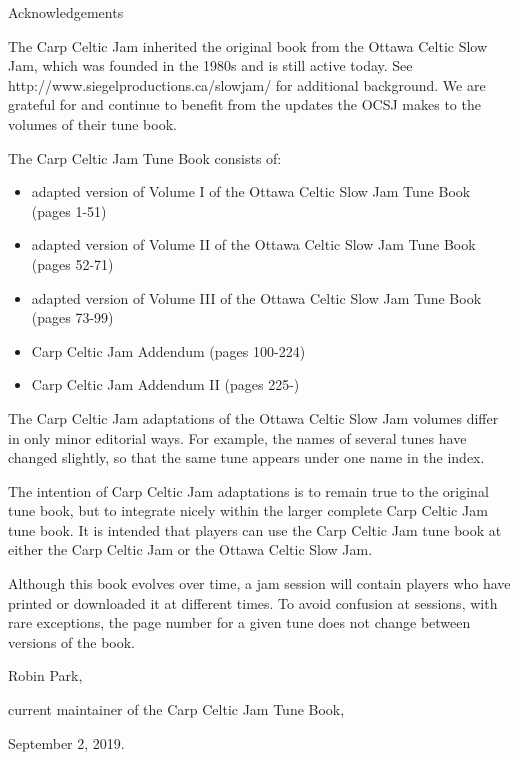\documentclass[10pt,fleqn]{article}
\begin{document}
\pagestyle{empty}
\setlength{\parindent}{0pt}
\setlength{\parskip}{1em}
\begin{center}
\LARGE
Acknowledgements
\normalsize
\end{center}

The Carp Celtic Jam inherited the original book from the Ottawa Celtic Slow Jam, which was founded in the 1980s and is still active today.  See http://www.siegelproductions.ca/slowjam/ for additional background.  We are grateful for and continue to benefit from the updates the OCSJ makes to the volumes of their tune book.

The Carp Celtic Jam Tune Book consists of:
\begin{itemize}
\item adapted version of Volume I of the Ottawa Celtic Slow Jam Tune Book (pages 1-51)
\item adapted version of Volume II of the Ottawa Celtic Slow Jam Tune Book (pages 52-71)
\item adapted version of Volume III of the Ottawa Celtic Slow Jam Tune Book (pages 73-99)
\item Carp Celtic Jam Addendum (pages 100-224)
\item Carp Celtic Jam Addendum II (pages 225-)
\end{itemize}

The Carp Celtic Jam adaptations of the Ottawa Celtic Slow Jam volumes differ in only minor editorial ways.  For example, the names of several tunes have changed slightly, so that the same tune appears under one name in the index.

The intention of Carp Celtic Jam adaptations is to remain true to the original tune book, but to integrate nicely within the larger complete Carp Celtic Jam tune book.  It is intended that players can use the Carp Celtic Jam tune book at either the Carp Celtic Jam or the Ottawa Celtic Slow Jam.

Although this book evolves over time, a jam session will contain players who have printed or downloaded it at different times.  To avoid confusion at sessions, with rare exceptions, the page number for a given tune does not change between versions of the book.

\begin{flushright}
\setlength{\parskip}{0pt}
Robin Park,

current maintainer of the Carp Celtic Jam Tune Book,

September 2, 2019.
\end{flushright}
\end{document}
